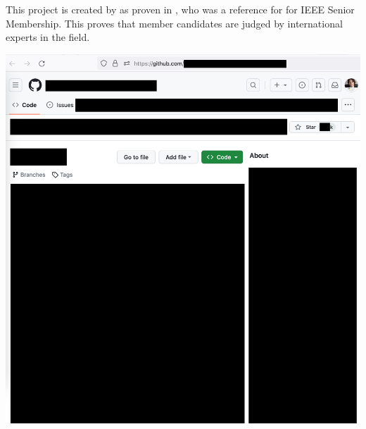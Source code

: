 
This project is created by \MrIeeeReferenceOne as proven in ,
who was a reference for \mrl for IEEE Senior Membership.
This proves that member candidates are judged by international experts in the field.

\includegraphics[width=\textwidth]{ieee-reference-one-project-two-stars_public}

\pagebreak
